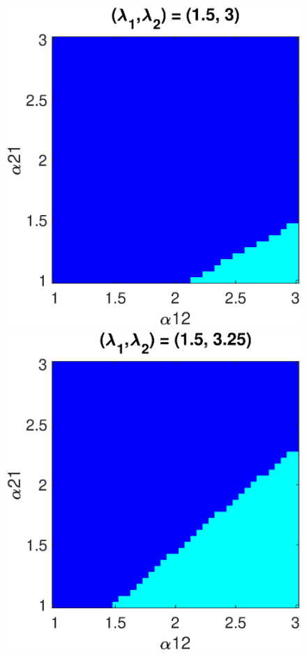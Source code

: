 \begin{figure}[h]
   \begin{minipage}{0.32\linewidth}
  \begin{center}
\includegraphics[width=1\linewidth]{Images/photo24_7.eps}
\end{center}
  \end{minipage} 
  \begin{minipage}{0.32\linewidth}
  \begin{center}
\includegraphics[width=1\linewidth]{Images/photo24_8.eps}
\end{center}


\end{minipage}
\end{figure}
